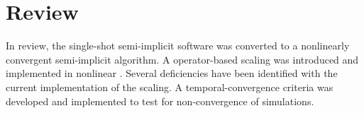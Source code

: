 \section{Review}
\label{sect:review}

In review, the single-shot semi-implicit \cobra software was converted to a nonlinearly convergent semi-implicit algorithm.
A operator-based scaling was introduced and implemented in nonlinear \cobra{}.
Several deficiencies have been identified with the current implementation of the scaling.
A temporal-convergence criteria was developed and implemented to test for non-convergence of simulations. 


